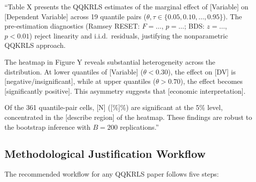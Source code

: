 \begin{examplebox}
``Table X presents the QQKRLS estimates of the marginal effect of [Variable] on [Dependent Variable] across 19 quantile pairs ($\theta, \tau \in \{0.05, 0.10, \ldots, 0.95\}$). The pre-estimation diagnostics (Ramsey RESET: $F = \ldots$, $p = \ldots$; BDS: $z = \ldots$, $p < 0.01$) reject linearity and i.i.d.\ residuals, justifying the nonparametric QQKRLS approach.

The heatmap in Figure Y reveals substantial heterogeneity across the distribution. At lower quantiles of [Variable] ($\theta < 0.30$), the effect on [DV] is [negative/insignificant], while at upper quantiles ($\theta > 0.70$), the effect becomes [significantly positive]. This asymmetry suggests that [economic interpretation].

Of the 361 quantile-pair cells, [N] ([\%]\%) are significant at the 5\% level, concentrated in the [describe region] of the heatmap. These findings are robust to the bootstrap inference with $B = 200$ replications.''
\end{examplebox}

\subsection{Methodological Justification Workflow}

The recommended workflow for any QQKRLS paper follows five steps:

\begin{center}
\end{center}
